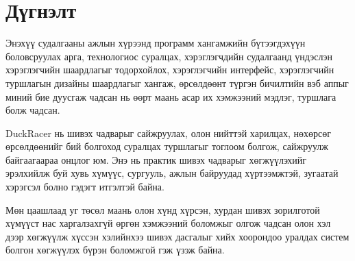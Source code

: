 \chapter{Дүгнэлт}
Энэхүү судалгааны ажлын хүрээнд программ хангамжийн бүтээгдэхүүн боловсруулах арга, технологиос суралцах, хэрэглэгчдийн судалгаанд үндэслэн хэрэглэгчийн шаардлагыг тодорхойлох, хэрэглэгчийн интерфейс, хэрэглэгчийн туршлагын дизайны шаардлагыг хангаж, өрсөлдөөнт түргэн бичилтийн вэб аппыг миний бие дуусгаж чадсан нь өөрт маань асар их хэмжээний мэдлэг, туршлага болж чадсан.

DuckRacer нь шивэх чадварыг сайжруулах, олон нийттэй харилцах, нөхөрсөг өрсөлдөөнийг бий болгоход суралцах туршлагыг тоглоом болгож, сайжруулж байгаагаараа онцлог юм. Энэ нь практик шивэх чадварыг хөгжүүлэхийг эрэлхийлж буй хувь хүмүүс, сургууль, ажлын байруудад хүртээмжтэй, зугаатай хэрэгсэл болно гэдэгт итгэлтэй байна.

Мөн цаашлаад уг төсөл маань олон хүнд хүрсэн, хурдан шивэх зорилготой хүмүүст нас харгалзахгүй өргөн хэмжээний боломжыг олгож чадсан олон хэл дээр хөгжүүлж хүссэн хэлийнхээ шивэх дасгалыг хийх хоорондоо уралдах систем болгон хөгжүүлэх бүрэн боломжгой гэж үзэж байна.